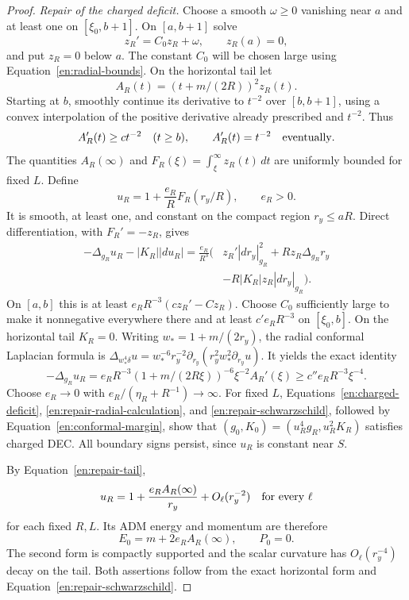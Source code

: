 \begin{proof}
\emph{Repair of the charged deficit.}
Choose a smooth $\omega\geq0$ vanishing near $a$ and at least one
on $[\xi_0,b+1]$. On $[a,b+1]$ solve
\[
 z_R'=C_0z_R+\omega,\qquad z_R(a)=0,
\]
and put $z_R=0$ below $a$. The constant $C_0$ will be chosen
large using Equation~\ref{en:radial-bounds}. On the horizontal
tail let
\[
 A_R(t)=(t+m/(2R))^2z_R(t).
\]
Starting at $b$, smoothly continue its derivative to $t^{-2}$
over $[b,b+1]$, using a convex interpolation of the positive
derivative already prescribed and $t^{-2}$. Thus
\begin{equation}\label{en:repair-tail}
 A_R'(t)\geq c t^{-2}\quad(t\geq b),\qquad
 A_R'(t)=t^{-2}\quad\hbox{eventually}.
\end{equation}
The quantities $A_R(\infty)$ and
$F_R(\xi)=\int_\xi^\infty z_R(t)\,dt$ are uniformly bounded
for fixed $L$. Define
\[
 u_R=1+\frac{e_R}{R}F_R(r_y/R),\qquad e_R>0.
\]
It is smooth, at least one, and constant on the compact region
$r_y\leq aR$. Direct differentiation, with $F_R'=-z_R$, gives
\begin{equation}\label{en:repair-radial-calculation}
 \begin{split}
 -\Delta_{g_R}u_R-|K_R||du_R|
 =\frac{e_R}{R^3}\bigl(&z_R'|dr_y|_{g_R}^2
          +Rz_R\Delta_{g_R}r_y\\
          &-R|K_R|z_R|dr_y|_{g_R}\bigr).
 \end{split}
\end{equation}
On $[a,b]$ this is at least
$e_RR^{-3}(c z_R'-C z_R)$. Choose $C_0$ sufficiently large
to make it nonnegative everywhere there and at least
$c'e_RR^{-3}$ on $[\xi_0,b]$.
On the horizontal tail $K_R=0$. Writing
$w_*=1+m/(2r_y)$, the radial conformal Laplacian formula is
$\Delta_{w_*^4\delta}u=w_*^{-6}r_y^{-2}
\partial_{r_y}(r_y^2w_*^2\partial_{r_y}u)$.
It yields the exact identity
\begin{equation}\label{en:repair-schwarzschild}
 -\Delta_{g_R}u_R
 =e_RR^{-3}(1+m/(2R\xi))^{-6}\xi^{-2}A_R'(\xi)
 \geq c''e_RR^{-3}\xi^{-4}.
\end{equation}
Choose $e_R\to0$ with $e_R/(\eta_R+R^{-1})\to\infty$.
For fixed $L$, Equations~\ref{en:charged-deficit},
\ref{en:repair-radial-calculation}, and
\ref{en:repair-schwarzschild}, followed by
Equation~\ref{en:conformal-margin}, show that
$(g_0,K_0)=(u_R^4g_R,u_R^2K_R)$ satisfies charged DEC.
All boundary signs persist, since $u_R$ is constant near $S$.

By Equation~\ref{en:repair-tail},
\[
 u_R=1+\frac{e_RA_R(\infty)}{r_y}+O_\ell(r_y^{-2})
 \quad\hbox{for every }\ell
\]
for each fixed $R,L$. Its ADM energy and momentum are therefore
\begin{equation}\label{en:repaired-mass}
 E_0=m+2e_RA_R(\infty),\qquad P_0=0.
\end{equation}
The second form is compactly supported and the scalar curvature
has $O_\ell(r_y^{-4})$ decay on the tail. Both assertions follow
from the exact horizontal form and
Equation~\ref{en:repair-schwarzschild}.


\end{proof}

